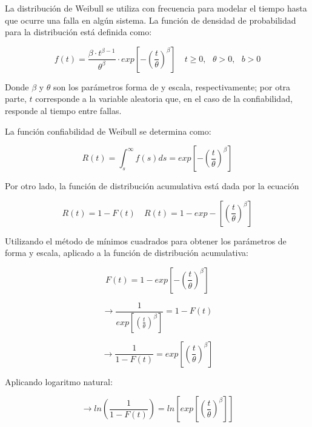 La distribución de Weibull se utiliza con frecuencia para modelar el tiempo hasta que ocurre una falla en algún sistema. La función de densidad de probabilidad para la distribución está definida como:

\begin{equation}
f(t)=\frac{\beta\cdot t^{\beta-1}}{\theta^\beta}\cdot exp\left[-\left(\frac{t}{\theta}\right)^\beta\right] \quad t\geq 0,\text{ }\theta>0,\text{ }b>0 
\end{equation}

Donde $\beta$ y $\theta$ son los parámetros forma de y escala, respectivamente; por otra parte, $t$ corresponde a la variable aleatoria que, en el caso de la confiabilidad, responde al tiempo entre fallas.

La función confiabilidad de Weibull se determina como:

\begin{equation}
R(t)=\int_{s}^{\infty}f(s)ds= exp\left[-\left(\frac{t}{\theta}\right)^\beta\right]
\end{equation}

Por otro lado, la función de distribución acumulativa está dada por la ecuación

\begin{equation}
R(t)=1-F(t)\quad R(t)=1-exp-\left[\left( \frac{t}{\theta}\right)^\beta\right]
\end{equation}

Utilizando el método de mínimos cuadrados para obtener los parámetros de forma y escala, aplicado a la función de distribución acumulativa:

\begin{equation}
F(t)=1-exp\left[-\left(\frac{t}{\theta}\right)^\beta\right]
\end{equation}

\begin{equation}
\rightarrow \frac{1}{exp \left[\left(\frac{t}{\theta}\right)^\beta\right]}=1-F(t)
\end{equation}

\begin{equation}
\rightarrow \frac{1}{1-F(t)}=exp\left[\left(\frac{t}{\theta}\right)^\beta\right]
\end{equation}

Aplicando logaritmo natural:

\begin{equation}
\rightarrow ln\left(\frac{1}{1-F(t)}\right)=ln\left[exp\left[\left(\frac{t}{\theta}\right)^\beta \right]\right]
\end{equation}

